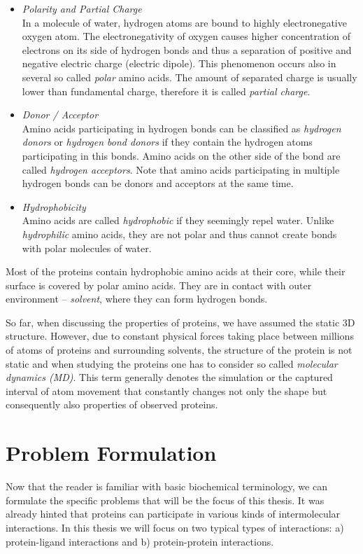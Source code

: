 \begin{itemize}
\setlength\itemsep{0.5pt}
\item{\textit{Polarity and Partial Charge}} \\ 
In a molecule of water, hydrogen atoms are bound to highly electronegative oxygen atom. The electronegativity of oxygen causes higher concentration of electrons on its side of hydrogen bonds and thus a separation of positive and negative electric charge (electric dipole). This phenomenon occurs also in several so called \textit{polar} amino acids. The amount of separated charge is usually lower than fundamental charge, therefore it is called \textit{partial charge}. 
\item{\textit{Donor / Acceptor}} \\
Amino acids participating in hydrogen bonds can be classified as \textit{hydrogen donors} or \textit{hydrogen bond donors} if they contain the hydrogen atoms participating in this bonds. Amino acids on the other side of the bond are called \textit{hydrogen acceptors}. Note that amino acids participating in multiple hydrogen bonds can be donors and acceptors at the same time.
\item{\textit{Hydrophobicity}} \\
 Amino acids are called \textit{hydrophobic} if they seemingly repel water. Unlike \textit{hydrophilic} amino acids, they are not polar and thus cannot create bonds with polar molecules of water.
\end{itemize}

Most of the proteins contain hydrophobic amino acids at their core, while their surface is covered by polar amino acids. They are in contact with outer environment -- \textit{solvent}, where they can form hydrogen bonds.

So far, when discussing the properties of proteins, we have assumed the static 3D structure. However, due to constant physical forces taking place between millions of atoms of proteins and surrounding solvents, the structure of the protein is not static and when studying the proteins one has to consider so called \textit{molecular dynamics (MD)}. This term generally denotes the simulation or the captured interval of atom movement that constantly changes not only the shape but consequently also properties of observed proteins. 

\section{Problem Formulation}
Now that the reader is familiar with basic biochemical terminology, we can formulate the specific problems that will be the focus of this thesis. It was already hinted that proteins can participate in various kinds of intermolecular interactions. In this thesis we will focus on two typical types of interactions: a) protein-ligand interactions and b) protein-protein interactions.

